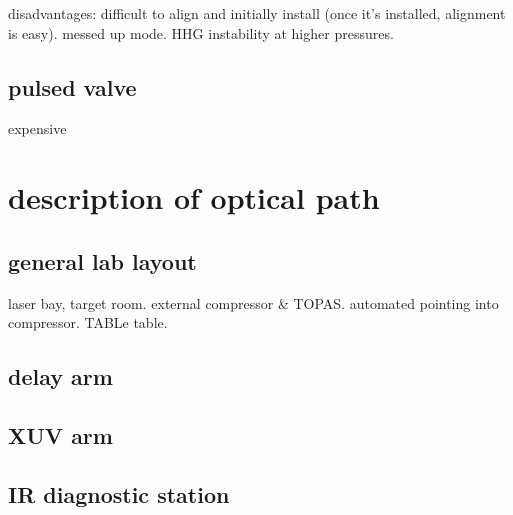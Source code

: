 disadvantages: difficult to align and initially install (once it's installed, alignment is easy). messed up mode. HHG instability at higher pressures.

\subsection{pulsed valve}

expensive

\section{description of optical path}
\subsection{general lab layout}
laser bay, target room. external compressor \& TOPAS. automated pointing into compressor. TABLe table.
\subsection{delay arm}
\subsection{XUV arm}
\subsection{IR diagnostic station}